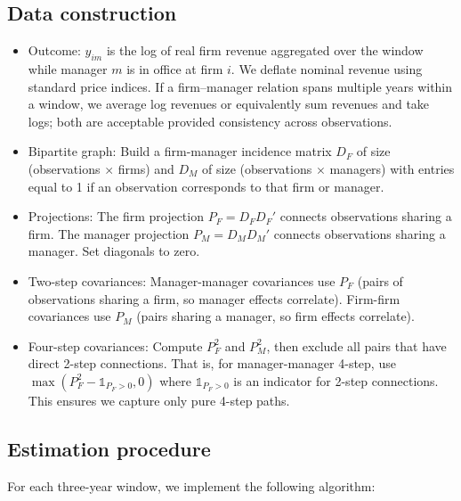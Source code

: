 \documentclass[11pt]{article}
\begin{document}
\subsection{Data construction}
\begin{itemize}
  \item Outcome: $y_{im}$ is the log of real firm revenue aggregated over the window while manager $m$ is in office at firm $i$. We deflate nominal revenue using standard price indices. If a firm--manager relation spans multiple years within a window, we average log revenues or equivalently sum revenues and take logs; both are acceptable provided consistency across observations.
  \item Bipartite graph: Build a firm-manager incidence matrix $D_F$ of size (observations $\times$ firms) and $D_M$ of size (observations $\times$ managers) with entries equal to 1 if an observation corresponds to that firm or manager.
  \item Projections: The firm projection $P_F = D_F D_F'$ connects observations sharing a firm. The manager projection $P_M = D_M D_M'$ connects observations sharing a manager. Set diagonals to zero.
  \item Two-step covariances: Manager-manager covariances use $P_F$ (pairs of observations sharing a firm, so manager effects correlate). Firm-firm covariances use $P_M$ (pairs sharing a manager, so firm effects correlate).
  \item Four-step covariances: Compute $P_F^2$ and $P_M^2$, then exclude all pairs that have direct 2-step connections. That is, for manager-manager 4-step, use $\max(P_F^2 - \mathbb{1}_{P_F>0}, 0)$ where $\mathbb{1}_{P_F>0}$ is an indicator for 2-step connections. This ensures we capture only pure 4-step paths.
\end{itemize}

\subsection{Estimation procedure}
\label{sec:estimation-procedure}
For each three-year window, we implement the following algorithm:
\end{document}
